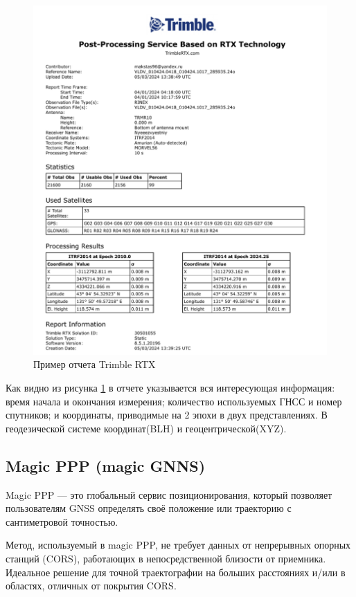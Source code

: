 \begin{figure}[h]
	\centering
	\includegraphics[width=\linewidth]{images/pic07}
	\caption{Пример отчета Trimble RTX}
	\label{fig:pic07}
\end{figure}

Как видно из рисунка \cref{fig:pic07} в отчете указывается вся интересующая информация: время начала и окончания измерения; количество используемых ГНСС и номер спутников; и координаты, приводимые на 2 эпохи в двух представлениях. В геодезической системе координат(BLH) и геоцентрической(XYZ). 

\subsection{Magic PPP (magic GNNS)}\label{subsec:ch2/sec1/sub2}

Magic PPP --- это глобальный сервис позиционирования, который позволяет пользователям GNSS определять своё положение или траекторию с сантиметровой точностью. 

Метод, используемый в magic PPP, не требует данных от непрерывных опорных станций (CORS), работающих в непосредственной близости от приемника. Идеальное решение для точной траектографии на больших расстояниях и/или в областях, отличных от покрытия CORS.

